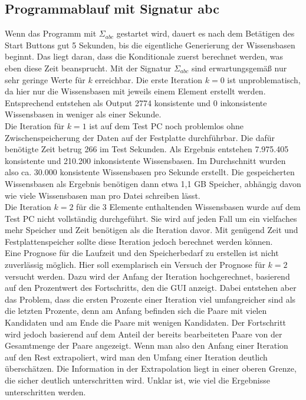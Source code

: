 \documentclass[12pt,a4paper]{article}
\begin{document}
\subsection{Programmablauf mit Signatur abc}
Wenn das Programm mit $\Sigma_{abc}$ gestartet wird, dauert es nach dem Betätigen des Start Buttons gut 5 Sekunden, bis die eigentliche Generierung der Wissensbasen beginnt. Das liegt daran, dass die Konditionale zuerst berechnet werden, was eben diese Zeit beansprucht. Mit der Signatur $\Sigma_{abc}$ sind erwartungsgemäß nur sehr geringe Werte für $k$ erreichbar. Die erste Iteration $k=0$ ist unproblematisch, da hier nur die Wissensbasen mit jeweils einem Element erstellt werden. Entsprechend entstehen als Output 2774 konsistente und 0 inkonsistente Wissensbasen in weniger als einer Sekunde. \\
Die Iteration für $k = 1$ ist auf dem Test PC noch problemlos ohne Zwischenspeicherung der Daten auf der Festplatte durchführbar. Die dafür benötigte Zeit betrug 266 im Test Sekunden. Als Ergebnis entstehen 7.975.405 konsistente und 210.200 inkonsistente Wissensbasen. Im Durchschnitt wurden also ca. 30.000 konsistente Wissensbasen pro Sekunde erstellt. Die gespeicherten Wissensbasen als Ergebnis benötigen dann etwa 1,1 GB Speicher, abhängig davon wie viele Wissensbasen man pro Datei schreiben lässt. \\
Die Iteration $k = 2$ für die 3 Elemente enthaltenden Wissensbasen wurde auf dem Test PC nicht vollständig durchgeführt. Sie wird auf jeden Fall um ein vielfaches mehr Speicher und Zeit benötigen als die Iteration davor. Mit genügend Zeit und Festplattenspeicher sollte diese Iteration jedoch berechnet werden können. \\
Eine Prognose für die Laufzeit und den Speicherbedarf zu erstellen ist nicht zuverlässig möglich. Hier soll exemplarisch ein Versuch der Prognose für $k=2$ versucht werden. Dazu wird der Anfang der Iteration hochgerechnet, basierend auf den Prozentwert des Fortschritts, den die GUI anzeigt. Dabei entstehen aber das Problem, dass die ersten Prozente einer Iteration viel umfangreicher sind als die letzten Prozente, denn am Anfang befinden sich die Paare mit vielen Kandidaten und am Ende die Paare mit wenigen Kandidaten. Der Fortschritt wird jedoch basierend auf dem Anteil der bereits bearbeiteten Paare von der Gesamtmenge der Paare angezeigt. Wenn man also den Anfang einer Iteration auf den Rest extrapoliert, wird man den Umfang einer Iteration deutlich überschätzen. Die Information in der Extrapolation liegt in einer oberen Grenze, die sicher deutlich unterschritten wird. Unklar ist, wie viel die Ergebnisse unterschritten werden. \\
\end{document}
